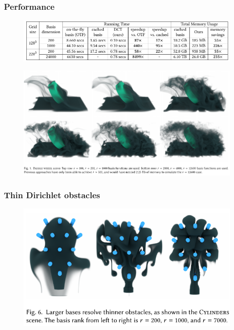\documentclass[serif,mathserif, 12pt]{beamer}
\begin{document}
\begin{frame} 
\end{frame}

\begin{frame}
  \frametitle{Performance}
  \begin{figure}
    \centering
    \includegraphics[width=\textwidth]{img/performance}
  \end{figure}
\end{frame}

\begin{frame}
  \begin{figure}
    \centering
    \includegraphics[width=\textwidth]{img/teaser}
  \end{figure}
\end{frame}

\begin{frame}
  \frametitle{Thin Dirichlet obstacles}
  \begin{figure}
    \centering
    \includegraphics[width=\textwidth]{img/smoke_obs}
  \end{figure}
\end{frame}
\end{document}
